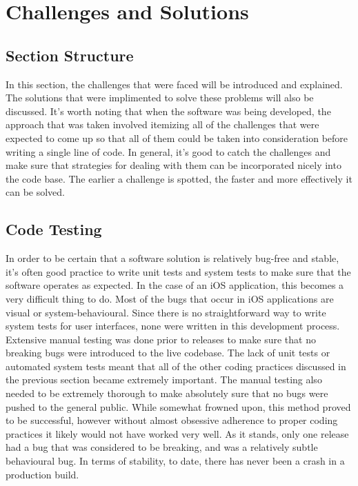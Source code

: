 \documentclass[se]{uw-wkrpt}
\begin{document}
\section{Challenges and Solutions}

\subsection{Section Structure}

In this section, the challenges that were faced will be introduced and
explained. The solutions that were implimented to solve these problems will
also be discussed. It's worth noting that when the software was being developed, 
the approach that was taken involved itemizing all of the challenges that were 
expected to come up so that all of them could be taken into consideration before 
writing a single line of code. In general, it's good to catch the challenges and
make sure that strategies for dealing with them can be incorporated nicely into
the code base. The earlier a challenge is spotted, the faster and more effectively
it can be solved.

\subsection{Code Testing}

In order to be certain that a software solution is relatively bug-free and stable,
it's often good practice to write unit tests and system tests to make sure that
the software operates as expected. In the case of an iOS application, this becomes
a very difficult thing to do. Most of the bugs that occur in iOS applications are
visual or system-behavioural. Since there is no straightforward way to write system
tests for user interfaces, none were written in this development process. Extensive 
manual testing was done prior to releases to make sure that no breaking bugs were
introduced to the live codebase. The lack of unit tests or automated system tests
meant that all of the other coding practices discussed in the previous section became
extremely important. The manual testing also needed to be extremely thorough to make
absolutely sure that no bugs were pushed to the general public. While somewhat frowned
upon, this method proved to be successful, however without almost obsessive adherence
to proper coding practices it likely would not have worked very well. As it stands, only
one release had a bug that was considered to be breaking, and was a relatively subtle
behavioural bug. In terms of stability, to date, there has never been a crash in a
production build.
\end{document}
